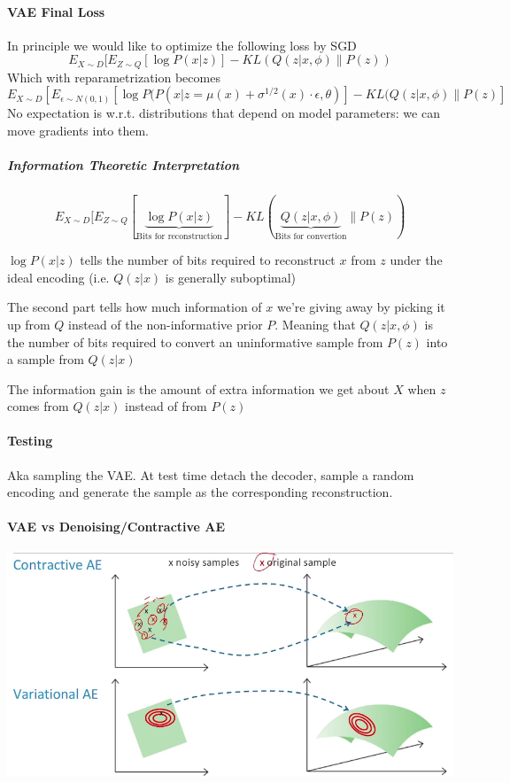 \documentclass[10pt]{report}
\begin{document}
\paragraph{VAE Final Loss} In principle we would like to optimize the following loss by SGD
$$E_{X\sim D}[E_{Z\sim Q}[\log P(x|z)]-KL(Q(z|x,\phi)\|P(z))$$
Which with reparametrization becomes
$$E_{X\sim D}[E_{\epsilon\sim N(0,1)}[\log P(P(x|z=\mu(x)+\sigma^{1/2}(x)\cdot\epsilon,\theta)]- KL(Q(z|x,\phi)\|P(z)]$$
No expectation is w.r.t. distributions that depend on model parameters: we can move gradients into them.
\subparagraph{Information Theoretic Interpretation}
$$E_{X\sim D}[E_{Z\sim Q}[\underset{\text{Bits for reconstruction}}{\underbrace{\log P(x|z)}}]-KL(\underset{\text{Bits for convertion}}{\underbrace{Q(z|x,\phi)}}\|P(z))$$
\begin{list}{}{}
	\item $\log P(x|z)$ tells the number of bits required to reconstruct $x$ from $z$ under the ideal encoding (i.e. $Q(z|x)$ is generally suboptimal)
	\item The second part tells how much information of $x$ we're giving away by picking it up from $Q$ instead of the non-informative prior $P$. Meaning that $Q(z|x,\phi)$ is the number of bits required to convert an uninformative sample from $P(z)$ into a sample from $Q(z|x)$
	\item The information gain is the amount of extra information we get about $X$ when $z$ comes from $Q(z|x)$ instead of from $P(z)$
\end{list}
\paragraph{Testing} Aka sampling the VAE. At test time detach the decoder, sample a random encoding and generate the sample as the corresponding reconstruction.
\paragraph{VAE vs Denoising/Contractive AE}
\begin{center}
	\includegraphics[scale=0.5]{145.png}
\end{center}
\pagebreak
\end{document}
